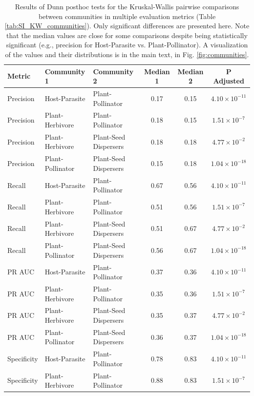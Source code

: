 \documentclass[oneside, a4paper, onecolumn, 11pt]{article}
\begin{document}
\begin{refsection}
\begin{table}[ht]
    \centering
    \caption{Results of Dunn posthoc tests for the Kruskal-Wallis pairwise comparisons between communities in multiple evaluation metrics (Table \ref{tab:SI_KW_communities}). Only significant differences are presented here. Note that the median values are close for some comparisons despite being statistically significant (e.g., precision for Host-Parasite vs. Plant-Pollinator). A visualization of the values and their distributions is in the main text, in Fig. \ref{fig:communities}.}
    \begin{tabular}{|l|l|l|c|c|c|}
        \hline
        Metric & Community 1 & Community 2 & Median 1 & Median 2 & P Adjusted \\
        \hline
        Precision & Host-Parasite & Plant-Pollinator & 0.17 & 0.15 & $4.10 \times 10^{-11}$ \\
        Precision & Plant-Herbivore & Plant-Pollinator & 0.18 & 0.15 & $1.51 \times 10^{-7}$ \\
        Precision & Plant-Herbivore & Plant-Seed Dispersers & 0.18 & 0.18 & $4.77 \times 10^{-2}$ \\
        Precision & Plant-Pollinator & Plant-Seed Dispersers & 0.15 & 0.18 & $1.04 \times 10^{-18}$ \\
        Recall & Host-Parasite & Plant-Pollinator & 0.67 & 0.56 & $4.10 \times 10^{-11}$ \\
        Recall & Plant-Herbivore & Plant-Pollinator & 0.51 & 0.56 & $1.51 \times 10^{-7}$ \\
        Recall & Plant-Herbivore & Plant-Seed Dispersers & 0.51 & 0.67 & $4.77 \times 10^{-2}$ \\
        Recall & Plant-Pollinator & Plant-Seed Dispersers & 0.56 & 0.67 & $1.04 \times 10^{-18}$ \\
        PR AUC & Host-Parasite & Plant-Pollinator & 0.37 & 0.36 & $4.10 \times 10^{-11}$ \\
        PR AUC & Plant-Herbivore & Plant-Pollinator & 0.35 & 0.36 & $1.51 \times 10^{-7}$ \\
        PR AUC & Plant-Herbivore & Plant-Seed Dispersers & 0.35 & 0.37 & $4.77 \times 10^{-2}$ \\
        PR AUC & Plant-Pollinator & Plant-Seed Dispersers & 0.36 & 0.37 & $1.04 \times 10^{-18}$ \\
        Specificity & Host-Parasite & Plant-Pollinator & 0.78 & 0.83 & $4.10 \times 10^{-11}$ \\
        Specificity & Plant-Herbivore & Plant-Pollinator & 0.88 & 0.83 & $1.51 \times 10^{-7}$ \\

\end{tabular}
\end{table}
\end{refsection}
\end{document}
